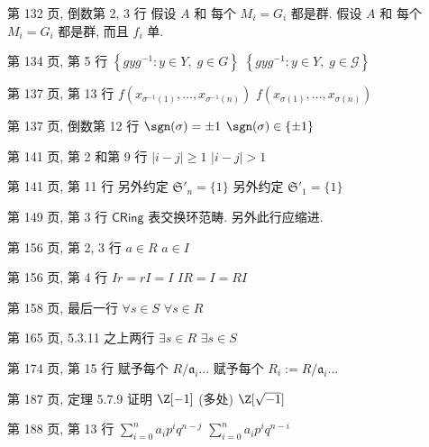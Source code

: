 \documentclass{AJerrata}
\begin{document}
\begin{Errata}
		\item[第 132 页, 倒数第 2, 3 行]
		\Orig 假设 $A$ 和 每个 $M_i = G_i$ 都是群.
		\Corr 假设 $A$ 和 每个 $M_i = G_i$ 都是群, 而且 $f_i$ 单.
		
		\item[第 134 页, 第 5 行]
		\Orig $\left\{ gyg^{-1}: y \in Y, \; g \in G \right\}$
		\Corr $\left\{ gyg^{-1}: y \in Y, \; g \in \mathcal{G} \right\}$

		\item[第 137 页, 第 13 行]
		\Orig $f(x_{\sigma^{-1}(1)}, \ldots, x_{\sigma^{-1}(n)})$
		\Corr $f(x_{\sigma(1)}, \ldots, x_{\sigma(n)})$

		\item[第 137 页, 倒数第 12 行]
		\Orig $\sgn(\sigma) = \pm 1$
		\Corr $\sgn(\sigma) \in \{\pm 1\}$

		\item[第 141 页, 第 2 和第 9 行]
		\Orig $|i - j| \geq 1$
		\Corr $|i - j| > 1$

        \item[第 141 页, 第 11 行]
        \Orig 另外约定 $\mathfrak{S}'_n = \{1\}$
        \Corr 另外约定 $\mathfrak{S}'_1 = \{1\}$

		\item[第 149 页, 第 3 行]
		$\mathsf{CRing}$ 表交换环范畴. 另外此行应缩进.
		
		\item[第 156 页, 第 2, 3 行]
		\Orig $a \in R$
		\Corr $a \in I$
		
		\item[第 156 页, 第 4 行]
		\Orig $Ir = rI = I$
		\Corr $IR = I = RI$

		\item[第 158 页, 最后一行]
		\Orig $\forall s \in S$
		\Corr $\forall s \in R$
		
		\item[第 165 页, 5.3.11 之上两行]
		\Orig $\exists s \in R$
		\Corr $\exists s \in S$
		
		\item[第 174 页, 第 15 行]
		\Orig 赋予每个 $R/\mathfrak{a}_i$...
		\Corr 赋予每个 $R_i := R/\mathfrak{a}_i$...

		\item[第 187 页, 定理 5.7.9 证明]
		\Orig $\Z[-1]$ (多处)
		\Corr $\Z[\sqrt{-1}]$

		\item[第 188 页, 第 13 行]
		\Orig $\sum_{i=0}^n a_i p^i q^{n-j}$
		\Corr $\sum_{i=0}^n a_i p^i q^{n-i}$


\end{Errata}
\end{document}
